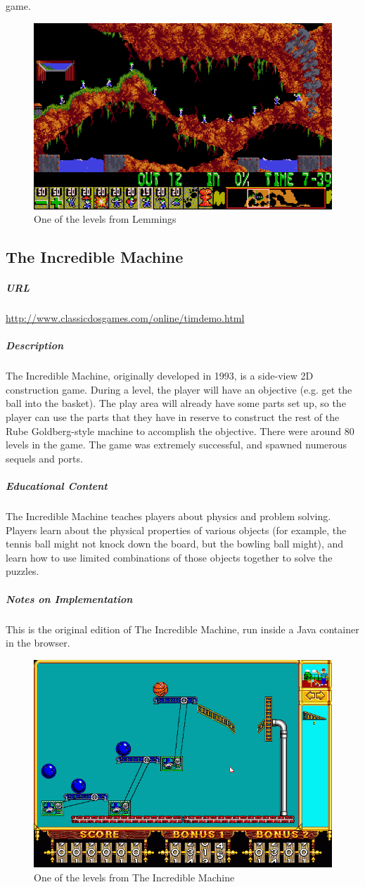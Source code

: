 game.\begin{figure}[p]\centering \includegraphics[height=.4\textheight, width=\textwidth, keepaspectratio=true]{img/lemmings_screen.jpg}\caption{One of the levels from Lemmings}\end{figure}\subsection{The Incredible Machine}\subparagraph{URL}\url{http://www.classicdosgames.com/online/timdemo.html}\subparagraph{Description}The Incredible Machine, originally developed in 1993, is a side-view 2D construction game. During a level, the player will have an objective (e.g. get the ball into the basket). The play area will already have some parts set up, so the player can use the parts that they have in reserve to construct the rest of the Rube Goldberg-style machine to accomplish the objective. There were around 80 levels in the game. The game was extremely successful, and spawned numerous sequels and ports.\subparagraph{Educational Content}The Incredible Machine teaches players about physics and problem solving. Players learn about the physical properties of various objects (for example, the tennis ball might not knock down the board, but the bowling ball might), and learn how to use limited combinations of those objects together to solve the puzzles. \subparagraph{Notes on Implementation}This is the original edition of The Incredible Machine, run inside a Java container in the browser.\begin{figure}[p]\centering \includegraphics[height=.4\textheight, width=\textwidth, keepaspectratio=true]{img/machine_screen.png}\caption{One of the levels from The Incredible Machine}\end{figure}